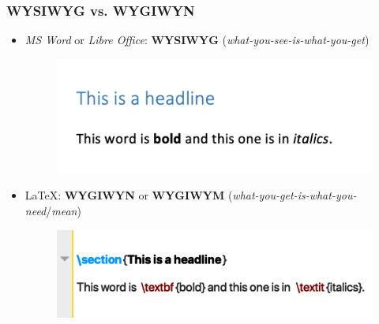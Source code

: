 \begin{frame}
\frametitle{WYSIWYG vs. WYGIWYN}

\begin{itemize}
	\item \emph{MS Word} or \emph{Libre Office}:
	\textbf{WYSIWYG} (\emph{what-you-see-is-what-you-get}) 
	
	\begin{figure}
		\includegraphics[scale=.3]{../../texfiles-beamer/tex-material/WissArb-latex/WYSIWYG}
	\end{figure}
		
	\item \LaTeX : \textbf{WYGIWYN} or \textbf{WYGIWYM} (\emph{what-you-get-is-what-you-need}/\emph{mean})
	
	\begin{figure}
		\includegraphics[scale=.3]{../../texfiles-beamer/tex-material/WissArb-latex/WYSIWYM}
	\end{figure}
	
\end{itemize}\end{frame}


